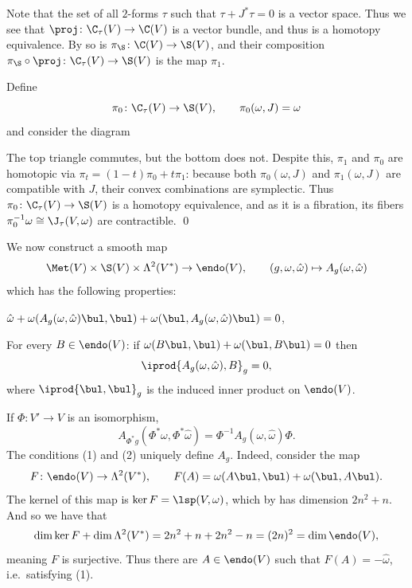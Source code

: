     Note that the set of all $2$-forms $\tau$ such that $\tau+J^*\tau=0$ is a vector space.
    Thus we see that $\proj\colon\C_\tau(V)\to\C(V)$ is a vector bundle, and thus is a homotopy equivalence.
    By  so is $\pi_\S\colon\C(V)\to\S(V)$, and their composition $\pi_\S\circ\proj\colon\C_\tau(V)\to\S(V)$ is the map $\pi_1$.

    Define
    $$ \pi_0\colon\C_\tau(V) \to \S(V),\qquad \pi_0(\omega,J) = \omega $$
    and consider the diagram


    The top triangle commutes, but the bottom does not.
    Despite this, $\pi_1$ and $\pi_0$ are homotopic via $\pi_t=(1-t)\pi_0+t\pi_1$: because both $\pi_0(\omega,J)$ and $\pi_1(\omega,J)$ are compatible with $J$, their convex combinations are symplectic.
    Thus $\pi_0\colon\C_\tau(V)\to\S(V)$ is a homotopy equivalence, and as it is a fibration, its fibers $\pi_0^{-1}\omega\cong\J_\tau(V,\omega)$ are contractible.
    \qed

\eproof

We now construct a smooth map
$$ \Met(V) \times \S(V) \times \Lambda^2(V^*) \to \endo(V),\qquad (g,\omega,\hat\omega) \mapsto A_g(\omega,\hat\omega) $$
which has the following properties:
\benum
    \item $\hat\omega+\omega(A_g(\omega,\hat\omega)\bul,\bul)+\omega(\bul,A_g(\omega,\hat\omega)\bul)=0$,
    \item For every $B\in\endo(V)$: if $\omega(B\bul,\bul)+\omega(\bul,B\bul)=0$ then
    $$ \iprod{A_g(\omega,\hat\omega),B}_g = 0 , $$
    where $\iprod{\bul,\bul}_g$ is the induced inner product on $\endo(V)$.
    \item If $\Phi\colon V'\to V$ is an isomorphism,
    $$ A_{\Phi^*g}(\Phi^*\omega,\Phi^*\hat\omega) = \Phi^{-1}A_g(\omega,\hat\omega)\Phi . $$
\eenum
The conditions (1) and (2) uniquely define $A_g$.
Indeed, consider the map
$$ F\colon\endo(V) \to \Lambda^2(V^*),\qquad F(A) = \omega(A\bul,\bul) + \omega(\bul,A\bul) . $$
The kernel of this map is $\ker F=\lsp(V,\omega)$, which by  has dimension $2n^2+n$.
And so we have that
$$ \dim\ker F + \dim\Lambda^2(V^*) = 2n^2 + n + 2n^2 - n = (2n)^2 = \dim\endo(V) , $$
meaning $F$ is surjective.
Thus there are $A\in\endo(V)$ such that $F(A)=-\hat\omega$, i.e.\ satisfying (1).

